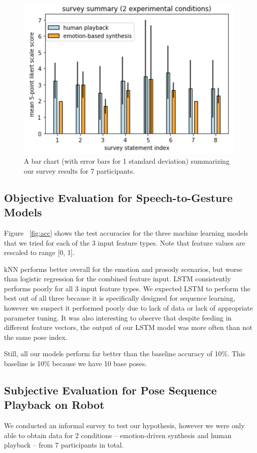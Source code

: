 \begin{figure}
\includegraphics[scale=0.6]{survey1.png}
\caption{A bar chart (with error bars for 1 standard deviation) summarizing our survey results for 7 participants.}
\label{fig:survey}
\end{figure}

\subsection{Objective Evaluation for Speech-to-Gesture Models}
Figure ~\ref{fig:acc} shows the test accuracies for the three machine learning models that we tried for each of the 3 input feature types. Note that feature values are rescaled to range [0, 1].

kNN performs better overall for the emotion and prosody scenarios, but worse than logistic regression for the combined feature input. LSTM consistently performs poorly for all 3 input feature types. We expected LSTM to perform the best out of all three because it is specifically designed for sequence learning, however we suspect it performed poorly due to lack of data or lack of appropriate parameter tuning. It was also interesting to observe that despite feeding in different feature vectors, the output of our LSTM model was more often than not the same pose index.

Still, all our models perform far better than the baseline accuracy of 10\%. This baseline is 10\% because we have 10 base poses.
\subsection{Subjective Evaluation for Pose Sequence Playback on Robot}
We conducted an informal survey to test our hypothesis, however we were only able to obtain data for 2 conditions -- emotion-driven synthesis and human playback -- from 7 participants in total.


